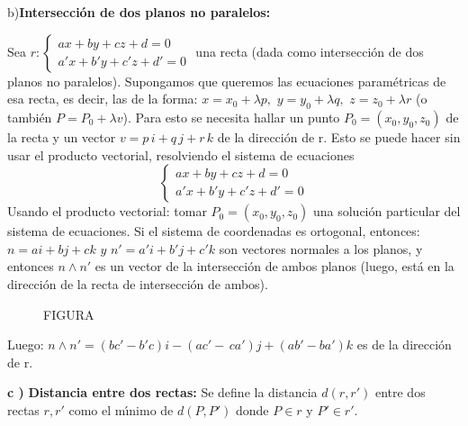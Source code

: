 \vspace{.5cm}

b)\textbf{Intersecci\'{o}n de dos planos no paralelos:}

Sea $r:\left\{ \begin{array}{l}
 {ax + by + cz + d = 0} \\
 {a'x + b'y + c'z + d' = 0}
 \end{array} \right.$ una recta (dada como intersecci\'{o}n de dos
planos no paralelos). Supongamos que queremos las ecuaciones
param\'{e}tricas de esa recta, es decir, las de la forma: $x =
x_{0}^{}  + \lambda p,\,\,y = y_{0}^{}  + \lambda q,\,\,z =
z_{0}^{}  + \lambda r$ (o tambi\'{e}n $P = P_{0}^{}  + \lambda
v$). Para esto se necesita hallar un punto $P_{0}^{}  = \left(
{x_{0}^{} ,y_{0}^{} ,z_{0}^{} } \right)$ de la recta y un vector
$v = p\,i + q\,j + r\,k$ de la direcci\'{o}n de r.
\bigskip
Esto se puede hacer sin usar el producto vectorial, resolviendo el
sistema de ecuaciones
\[
\left\{ \begin{array}{l}
 {ax + by + cz + d = 0} \\
 {a'x + b'y + c'z + d' = 0}
 \end{array} \right.
\]
Usando el producto vectorial: tomar $P_{0}^{}  = \left( {x_{0}^{}
,y_{0}^{} ,z_{0}^{} } \right)$ una soluci\'{o}n particular del
sistema de ecuaciones. Si el sistema de coordenadas es ortogonal,
entonces:
 $n = ai + bj + ck\,\,y\,\,n' = a'i + b'j + c'k$ son vectores normales a los
planos, y entonces $n \wedge n'$ es un vector de la
intersecci\'{o}n de ambos planos (luego, est\'{a} en la
direcci\'{o}n de la recta de intersecci\'{o}n de ambos).


\begin{figure}[htb]
\centering
FIGURA
\end{figure}
%
%

Luego: $n \wedge n'$$ = \left( {bc' - b'c} \right)i - \left( {ac'
- \,ca'} \right)j + \left( {ab' - ba'} \right)k$ es de la
direcci\'{o}n de r.

\bigskip
\textbf{c ) }\textbf {Distancia entre dos rectas:} Se define la
distancia $d\left( {r,r'} \right)$ entre dos rectas $r,r'$ como el
m\'{\i}nimo de $d\left( {P,P'} \right)$ donde $P \in r$ y $P' \in
r'$.

